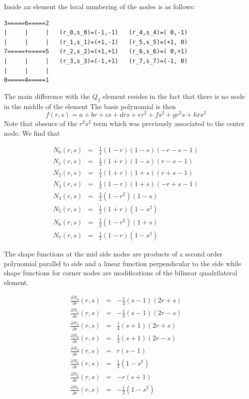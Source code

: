 Inside an element the local numbering of the nodes is as follows:
\begin{verbatim}
3=====6=====2
|     |     |   (r_0,s_0)=(-1,-1)   (r_4,s_4)=( 0,-1)
|     |     |   (r_1,s_1)=(+1,-1)   (r_5,s_5)=(+1, 0)
7=====+=====5   (r_2,s_2)=(+1,+1)   (r_6,s_6)=( 0,+1)
|     |     |   (r_3,s_3)=(-1,+1)   (r_7,s_7)=(-1, 0)
|     |     |    
0=====4=====1
\end{verbatim}
The main difference with the $Q_2$ element resides in the fact that there is 
no node in the middle of the element
The basis polynomial is then
\[
f(r,s) = a + br + cs + drs + er^2 + fs^2 + gr^2s + hrs^2
\]
Note that absence of the $r^2s^2$ term which was previously associated 
to the center node. We find that 
\begin{mdframed}[backgroundcolor=blue!5]
\begin{eqnarray}
N_0(r,s)&=& \frac{1}{4}(1-r)(1-s)(-r-s-1) \\
N_1(r,s)&=& \frac{1}{4}(1+r)(1-s)(r-s-1) \\
N_2(r,s)&=& \frac{1}{4}(1+r)(1+s)(r+s-1) \\
N_3(r,s)&=& \frac{1}{4}(1-r)(1+s)(-r+s-1) \\
N_4(r,s)&=& \frac{1}{2}(1-r^2)(1-s)  \\
N_5(r,s)&=& \frac{1}{2}(1+r)  (1-s^2)\\
N_6(r,s)&=& \frac{1}{2}(1-r^2)(1+s)  \\
N_7(r,s)&=& \frac{1}{2}(1-r)  (1-s^2)
\end{eqnarray}
\end{mdframed}

The shape functions at the mid side nodes are products of a 
second order polynomial parallel to side and 
a linear function perpendicular to the side
while shape functions for corner nodes are modifications of the bilinear
quadrilateral element.

\begin{mdframed}[backgroundcolor=blue!5]
\begin{eqnarray}
\frac{\partial N_0}{\partial r}(r,s)&=& -\frac{1}{4}(s-1)(2r+s)  \\
\frac{\partial N_1}{\partial r}(r,s)&=& -\frac{1}{4}(s-1)(2r-s)  \\
\frac{\partial N_2}{\partial r}(r,s)&=& \frac{1}{4}(s+1)(2r+s)  \\
\frac{\partial N_3}{\partial r}(r,s)&=& \frac{1}{4}(s+1)(2r-s)  \\
\frac{\partial N_4}{\partial r}(r,s)&=& r(s-1)  \\
\frac{\partial N_5}{\partial r}(r,s)&=& \frac{1}{2} (1-s^2)  \\
\frac{\partial N_6}{\partial r}(r,s)&=& -r(s+1)  \\
\frac{\partial N_7}{\partial r}(r,s)&=& -\frac{1}{2} (1-s^2)  
\end{eqnarray}
\end{mdframed}

